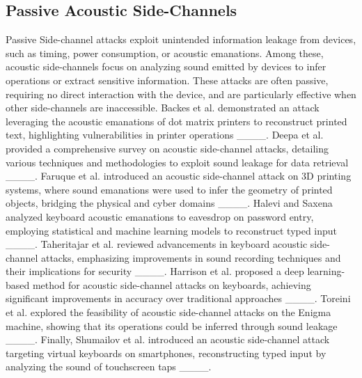 \subsection{Passive Acoustic Side-Channels}
Passive Side-channel attacks exploit unintended information leakage from devices, such as timing, power consumption, or acoustic emanations. Among these, acoustic side-channels focus on analyzing sound emitted by devices to infer operations or extract sensitive information. These attacks are often passive, requiring no direct interaction with the device, and are particularly effective when other side-channels are inaccessible. Backes et al. demonstrated an attack leveraging the acoustic emanations of dot matrix printers to reconstruct printed text, highlighting vulnerabilities in printer operations ____. Deepa et al. provided a comprehensive survey on acoustic side-channel attacks, detailing various techniques and methodologies to exploit sound leakage for data retrieval ____. Faruque et al. introduced an acoustic side-channel attack on 3D printing systems, where sound emanations were used to infer the geometry of printed objects, bridging the physical and cyber domains ____. Halevi and Saxena analyzed keyboard acoustic emanations to eavesdrop on password entry, employing statistical and machine learning models to reconstruct typed input ____. Taheritajar et al. reviewed advancements in keyboard acoustic side-channel attacks, emphasizing improvements in sound recording techniques and their implications for security ____. Harrison et al. proposed a deep learning-based method for acoustic side-channel attacks on keyboards, achieving significant improvements in accuracy over traditional approaches ____. Toreini et al. explored the feasibility of acoustic side-channel attacks on the Enigma machine, showing that its operations could be inferred through sound leakage ____. Finally, Shumailov et al. introduced an acoustic side-channel attack targeting virtual keyboards on smartphones, reconstructing typed input by analyzing the sound of touchscreen taps ____.